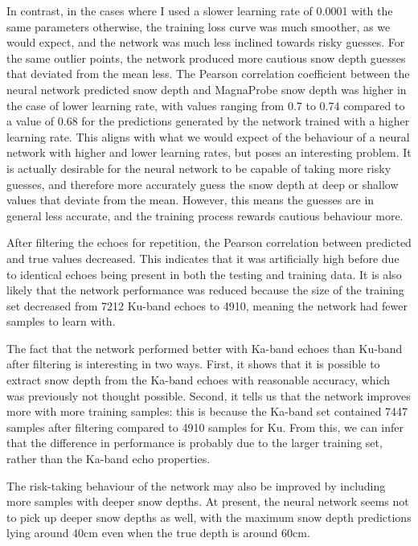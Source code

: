 \documentclass[11pt, a4paper]{article}
\begin{document}
In contrast, in the cases where I used a slower learning rate of 0.0001 with the same parameters otherwise, the training loss curve was much smoother, as we would expect, and the network was much less inclined towards risky guesses.  For the same outlier points, the network produced more cautious snow depth guesses that deviated from the mean less.  The Pearson correlation coefficient between the neural network predicted snow depth and MagnaProbe snow depth was higher in the case of lower learning rate,  with values ranging from 0.7 to 0.74 compared to a value of 0.68 for the predictions generated by the network trained with a higher learning rate. This aligns with what we would expect of the behaviour of a neural network with higher and lower learning rates, but poses an interesting problem. It is actually desirable for the neural network to be capable of taking more risky guesses, and therefore more accurately guess the snow depth at deep or shallow values that deviate from the mean. However, this means the guesses are in general less accurate, and the training process rewards cautious behaviour more. 

After filtering the echoes for repetition, the Pearson correlation between predicted and true values decreased. This indicates that it was artificially high before due to identical echoes being present in both the testing and training data. It is also likely that the network performance was reduced because the size of the training set decreased from 7212 Ku-band echoes to 4910, meaning the network had fewer samples to learn with. 

The fact that the network performed better with Ka-band echoes than Ku-band after filtering is interesting in two ways.  First, it shows that it is possible to extract snow depth from the Ka-band echoes with reasonable accuracy, which was previously not thought possible.  Second, it tells us that the network improves more with more training samples: this is because the Ka-band set contained 7447 samples after filtering compared to 4910 samples for Ku.  From this, we can infer that the difference in performance is probably due to the larger training set, rather than the Ka-band echo properties. 

The risk-taking behaviour of the network may also be improved by including more samples with deeper snow depths. At present, the neural network seems not to pick up deeper snow depths as well, with the maximum snow depth predictions lying around 40cm even when the true depth is around 60cm.
\end{document}
